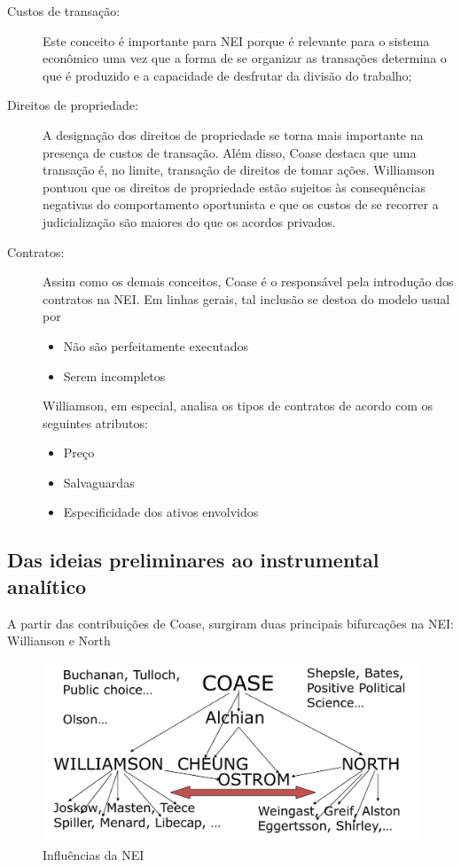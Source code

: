 \begin{description}
	\item[Custos de transação:] Este conceito é importante para NEI porque é relevante para o sistema econômico uma vez que a forma de se organizar as transações determina o que é produzido e a capacidade de desfrutar da divisão do trabalho;
	\item[Direitos de propriedade:] A designação dos direitos de propriedade se torna mais importante na presença de custos de transação. Além disso, Coase destaca que uma transação é, no limite, transação de direitos de tomar ações. Williamson pontuou que os direitos de propriedade estão sujeitos às consequências negativas do comportamento oportunista e que os custos de se recorrer a judicialização são maiores do que os acordos privados.
	\item[Contratos:] Assim como os demais conceitos, Coase é o responsável pela introdução dos contratos na NEI. Em linhas gerais, tal inclusão se destoa do modelo usual por
	\begin{itemize}
		\item Não são perfeitamente executados
		\item Serem incompletos
	\end{itemize}
	Williamson, em especial, analisa os tipos de contratos de acordo com os seguintes atributos:
	\begin{itemize}
		\item Preço
		\item Salvaguardas
		\item Especificidade dos ativos envolvidos
	\end{itemize}
\end{description}

\subsection*{Das ideias preliminares ao instrumental analítico}

A partir das contribuições de Coase, surgiram duas principais bifurcações na NEI: Willianson e North

\begin{figure}[h]
	\centering
	\caption{Influências da NEI}
	\label{fig:screenshot001}
	\includegraphics[width=0.7\linewidth]{screenshot001}
\end{figure}


